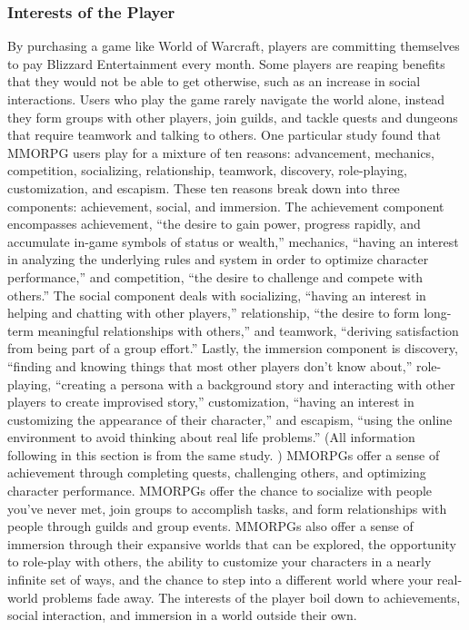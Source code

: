 \documentclass[11pt]{article}
\begin{document}
\begin{multicols}{2}
\subsubsection{Interests of the Player}
By purchasing a game like World of Warcraft, players are committing themselves to pay Blizzard Entertainment every month. \cite{WoWSubscription} Some players are reaping benefits that they would not be able to get otherwise, such as an increase in social interactions. \cite{IsThereEvidenceOfInternetAddiction} Users who play the game rarely navigate the world alone, instead they form groups with other players, join guilds, and tackle quests and dungeons that require teamwork and talking to others.
One particular study found that MMORPG users play for a mixture of ten reasons: advancement, mechanics, competition, socializing, relationship, teamwork, discovery, role-playing, customization, and escapism. These ten reasons break down into three components: achievement, social, and immersion. \cite{PlayerMotivations} The achievement component encompasses achievement, ``the desire to gain power, progress rapidly, and accumulate in-game symbols of status or wealth,'' mechanics, ``having an interest in analyzing the underlying rules and system in order to optimize character performance,'' and competition, ``the desire to challenge and compete with others.'' The social component deals with socializing, ``having an interest in helping and chatting with other players,'' relationship, ``the desire to form long-term meaningful relationships with others,'' and teamwork, ``deriving satisfaction from being part of a group effort.'' Lastly, the immersion component is discovery, ``finding and knowing things that most other players don't know about,'' role-playing, ``creating a persona with a background story and interacting with other players to create improvised story,'' customization, ``having an interest in customizing the appearance of their character,'' and escapism, ``using the online environment to avoid thinking about real life problems.'' \cite{PlayerMotivations} (All information following in this section is from the same study. \cite{PlayerMotivations}) MMORPGs offer a sense of achievement through completing quests, challenging others, and optimizing character performance. MMORPGs offer the chance to socialize with people you've never met, join groups to accomplish tasks, and form relationships with people through guilds and group events. MMORPGs also offer a sense of immersion through their expansive worlds that can be explored, the opportunity to role-play with others, the ability to customize your characters in a nearly infinite set of ways, and the chance to step into a different world where your real-world problems fade away. The interests of the player boil down to achievements, social interaction, and immersion in a world outside their own.


\end{multicols}
\end{document}
